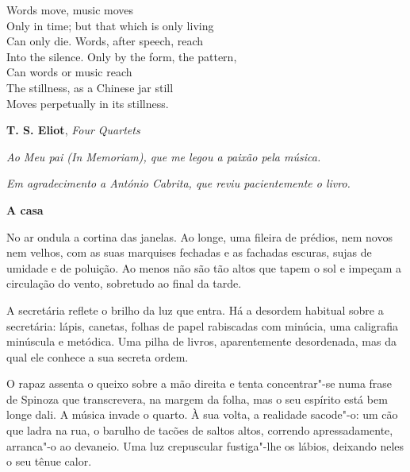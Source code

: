 \movetooddpage
\thispagestyle{empty}
\begin{vplace}[0.8]
\begin{flushright}
Words move, music moves\\
Only in time; but that which is only living\\
Can only die. Words, after speech, reach\\
Into the silence. Only by the form, the pattern,\\
Can words or music reach\\
The stillness, as a Chinese jar still\\
Moves perpetually in its stillness.

\medskip

\textbf{T. S. Eliot}, \emph{Four Quartets}
\end{flushright}
\end{vplace}
\pagebreak

\thispagestyle{empty}
\begin{flushright}
\begin{vplace}[0.8]
\emph{Ao Meu pai (\emph{In Memoriam}), que me legou a paixão pela música.}

\medskip

\emph{Em agradecimento a António Cabrita, que reviu pacientemente o livro.}
\end{vplace}
\end{flushright}

\vspace*{1.8cm}
\noindent{}\textbf{A casa}

\bigskip

No ar ondula a cortina das janelas. Ao longe, uma fileira de prédios,
nem novos nem velhos, com as suas marquises fechadas e as fachadas
escuras, sujas de umidade e de poluição. Ao menos não são tão altos que
tapem o sol e impeçam a circulação do vento, sobretudo ao final da
tarde.

A secretária reflete o brilho da luz que entra. Há a desordem habitual
sobre a secretária: lápis, canetas, folhas de papel rabiscadas com
minúcia, uma caligrafia minúscula e metódica. Uma pilha de livros,
aparentemente desordenada, mas da qual ele conhece a sua secreta ordem.

O rapaz assenta o queixo sobre a mão direita e tenta concentrar"-se numa
frase de Spinoza que transcrevera, na margem da folha, mas o seu
espírito está bem longe dali. A música invade o quarto. À sua volta, a
realidade sacode"-o: um cão que ladra na rua, o barulho de tacões de
saltos altos, correndo apressadamente, arranca"-o ao devaneio. Uma luz
crepuscular fustiga"-lhe os lábios, deixando neles o seu tênue calor.

